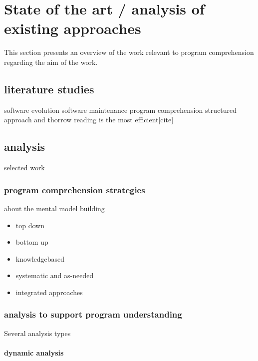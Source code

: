 \chapter{State of the art / analysis of existing approaches}

This section presents an overview of the work relevant to program comprehension regarding the aim of the work.

\section{literature studies}

software evolution
software maintenance
program comprehension
structured approach and thorrow reading is the most efficient[cite]

\section{analysis}

selected work

\subsection{program comprehension strategies}

about the mental model building

\begin{itemize}
\item top down
\item bottom up
\item knowledgebased
\item systematic and as-needed
\item integrated approaches
\end{itemize}

\subsection{analysis to support program understanding}

Several analysis types

\subsubsection{dynamic analysis}

